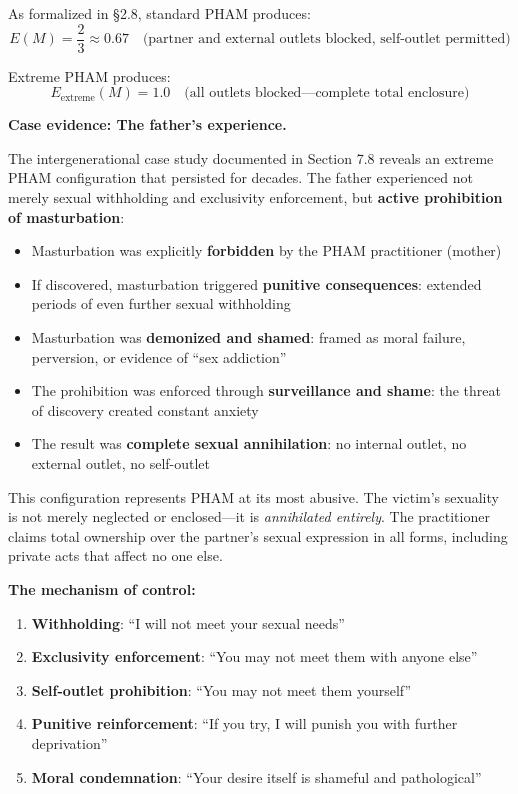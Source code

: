 \documentclass[12pt,openany]{book}
\numberwithin{equation}{chapter}
\begin{document}
As formalized in \S 2.8, standard PHAM produces:
\[
E(M) = \frac{2}{3} \approx 0.67 \quad \text{(partner and external outlets blocked, self-outlet permitted)}
\]

Extreme PHAM produces:
\[
E_{\text{extreme}}(M) = 1.0 \quad \text{(all outlets blocked---complete total enclosure)}
\]

\textbf{Case evidence: The father's experience.}

The intergenerational case study documented in Section 7.8 reveals an extreme PHAM configuration that persisted for decades. The father experienced not merely sexual withholding and exclusivity enforcement, but \textbf{active prohibition of masturbation}:

\begin{itemize}
    \item Masturbation was explicitly \textbf{forbidden} by the PHAM practitioner (mother)
    \item If discovered, masturbation triggered \textbf{punitive consequences}: extended periods of even further sexual withholding
    \item Masturbation was \textbf{demonized and shamed}: framed as moral failure, perversion, or evidence of ``sex addiction''
    \item The prohibition was enforced through \textbf{surveillance and shame}: the threat of discovery created constant anxiety
    \item The result was \textbf{complete sexual annihilation}: no internal outlet, no external outlet, no self-outlet
\end{itemize}

This configuration represents PHAM at its most abusive. The victim's sexuality is not merely neglected or enclosed---it is \textit{annihilated entirely}. The practitioner claims total ownership over the partner's sexual expression in all forms, including private acts that affect no one else.

\textbf{The mechanism of control:}

\begin{enumerate}
    \item \textbf{Withholding}: ``I will not meet your sexual needs''
    \item \textbf{Exclusivity enforcement}: ``You may not meet them with anyone else''
    \item \textbf{Self-outlet prohibition}: ``You may not meet them yourself''
    \item \textbf{Punitive reinforcement}: ``If you try, I will punish you with further deprivation''
    \item \textbf{Moral condemnation}: ``Your desire itself is shameful and pathological''
\end{enumerate}
\end{document}

